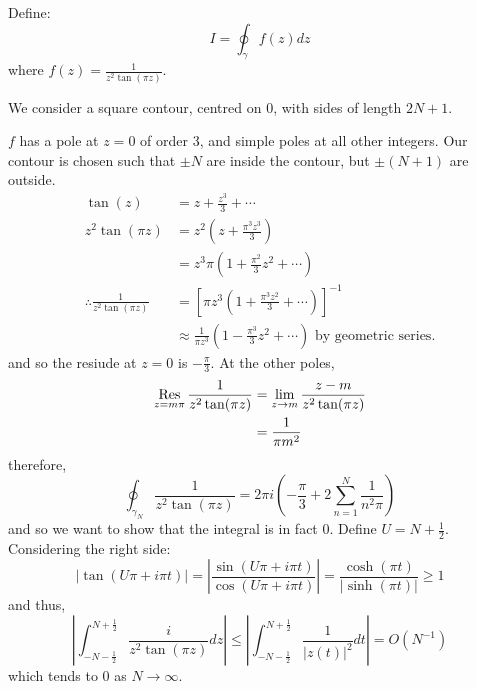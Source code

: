 \documentclass[../Main.tex]{subfiles}
\begin{document}
\begin{example}
    Define:
    \begin{equation*}
        I = \oint_{\gamma} f(z) dz
    \end{equation*}
    where $f(z) = \frac{1}{z^2 \tan(\pi z)}$.

    We consider a square contour, centred on $0$, with sides of length $2N + 1$.

    $f$ has a pole at $z=0$ of order 3, and simple poles at all other integers. Our contour is chosen such that $\pm N$ are inside the contour, but $\pm (N+1)$ are outside.
    \begin{align*}
        \tan(z) &= z + \frac{z^3}{3} + \cdots \\
        z^2 \tan(\pi z) &= z^2(z + \frac{\pi^3 z^3}{3}) \\
        &= z^3 \pi (1 + \frac{\pi^2}{3} z^2 + \cdots) \\
        \therefore \frac{1}{z^2 \tan(\pi z)} &= \left[\pi z^3 (1 + \frac{\pi^3 z^2}{3} + \cdots)\right]^{-1} \\
        &\approx \frac1{\pi z^3} \left(1 - \frac{\pi^3}{3}z^2 + \cdots\right) \text{ by geometric series}.
    \end{align*}
    and so the resiude at $z = 0$ is $-\frac{\pi}{3}$. At the other poles,
    \begin{align*}
        \operatorname*{Res}_{z = m\pi} \frac{1}{z^2 \tan(\pi z)} &= \lim_{z \to m} \frac{z - m}{z^2 \tan(\pi z)} \\
        &= \frac{1}{\pi m^2}
    \end{align*}
    therefore,
    \begin{equation*}
        \oint_{\gamma_N} \frac{1}{z^2 \tan(\pi z)} = 2\pi i(-\frac{\pi}{3} + 2 \sum_{n=1}^{N} \frac{1}{n^2 \pi})
    \end{equation*}
    and so we want to show that the integral is in fact $0$. Define $U = N + \frac12$. Considering the right side:
    \begin{equation*}
        \left|\tan(U \pi + i \pi t)\right| = \left|\frac{\sin(U\pi + i \pi t)}{\cos(U \pi + i \pi t)}\right| = \frac{\cosh(\pi t)}{|\sinh(\pi t)|} \geq 1
    \end{equation*}
    and thus,
    \begin{equation*}
        \left|\int_{-N - \frac12}^{N + \frac12} \frac{i}{z^2\tan(\pi z)} dz\right| \leq \left|\int_{-N-\frac12}^{N + \frac12} \frac{1}{|z(t)|^2}dt\right| = O(N^{-1})
    \end{equation*}
    which tends to $0$ as $N \to \infty$.
\end{example}
\end{document}
